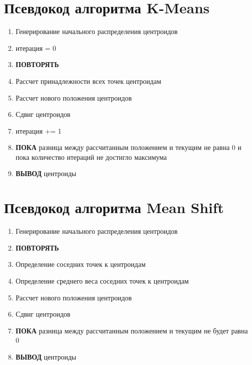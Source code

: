 \newpage

\section{Псевдокод алгоритма K-Means}\label{ref:kmeans}
\noindent
\begin{enumerate}\itemsep -.5ex
    \item Генерирование начального распределения центроидов
    \item итерация = 0
    \item \textbf{ПОВТОРЯТЬ}
    \item Рассчет принадлежности всех точек центроидам
    \item Рассчет нового положения центроидов
    \item Сдвиг центроидов
    \item итерация += 1
    \item \textbf{ПОКА} разница между рассчитанным положением и текущим не равна 0 и пока
        количество итераций не достигло максимума
    \item \textbf{ВЫВОД} центроиды
\end{enumerate}

\section{Псевдокод алгоритма Mean Shift}\label{ref:meanshift}
\noindent
\begin{enumerate}\itemsep -.5ex
    \item Генерирование начального распределения центроидов
    \item \textbf{ПОВТОРЯТЬ}
    \item Определение соседних точек к центроидам
    \item Определение среднего веса соседних точек к центроидам
    \item Рассчет нового положения центроидов
    \item Сдвиг центроидов
    \item \textbf{ПОКА} разница между рассчитанным положением и текущим не будет равна 0
    \item \textbf{ВЫВОД} центроиды
\end{enumerate}

